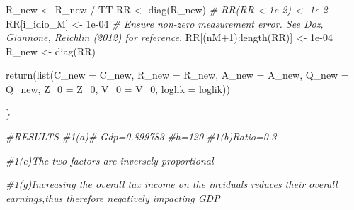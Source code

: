 \documentclass[
]{article}
\newenvironment{Shaded}{\begin{snugshade}}{\end{snugshade}}
\newcommand{\AttributeTok}[1]{\textcolor[rgb]{0.77,0.63,0.00}{#1}}
\newcommand{\CommentTok}[1]{\textcolor[rgb]{0.56,0.35,0.01}{\textit{#1}}}
\newcommand{\DecValTok}[1]{\textcolor[rgb]{0.00,0.00,0.81}{#1}}
\newcommand{\FloatTok}[1]{\textcolor[rgb]{0.00,0.00,0.81}{#1}}
\newcommand{\FunctionTok}[1]{\textcolor[rgb]{0.00,0.00,0.00}{#1}}
\newcommand{\NormalTok}[1]{#1}
\newcommand{\OtherTok}[1]{\textcolor[rgb]{0.56,0.35,0.01}{#1}}
\newcommand{\SpecialCharTok}[1]{\textcolor[rgb]{0.00,0.00,0.00}{#1}}
\begin{document}
\begin{Shaded}
\begin{Highlighting}[]
\NormalTok{  R\_new }\OtherTok{\textless{}{-}}\NormalTok{ R\_new }\SpecialCharTok{/}\NormalTok{ TT}
\NormalTok{  RR }\OtherTok{\textless{}{-}} \FunctionTok{diag}\NormalTok{(R\_new) }\CommentTok{\# RR(RR \textless{} 1e{-}2) \textless{}{-} 1e{-}2}
\NormalTok{  RR[i\_idio\_M] }\OtherTok{\textless{}{-}} \FloatTok{1e{-}04} \CommentTok{\# Ensure non{-}zero measurement error. See Doz, Giannone, Reichlin (2012) for reference.}
\NormalTok{  RR[(nM}\SpecialCharTok{+}\DecValTok{1}\NormalTok{)}\SpecialCharTok{:}\FunctionTok{length}\NormalTok{(RR)] }\OtherTok{\textless{}{-}} \FloatTok{1e{-}04}
\NormalTok{  R\_new }\OtherTok{\textless{}{-}} \FunctionTok{diag}\NormalTok{(RR) }
  
  \FunctionTok{return}\NormalTok{(}\FunctionTok{list}\NormalTok{(}\AttributeTok{C\_new =}\NormalTok{ C\_new, }\AttributeTok{R\_new =}\NormalTok{ R\_new, }\AttributeTok{A\_new =}\NormalTok{ A\_new, }\AttributeTok{Q\_new =}\NormalTok{ Q\_new, }\AttributeTok{Z\_0 =}\NormalTok{ Z\_0, }\AttributeTok{V\_0 =}\NormalTok{ V\_0, }\AttributeTok{loglik =}\NormalTok{ loglik))}
  
\NormalTok{\}}

\CommentTok{\#RESULTS}
\CommentTok{\#1(a)\# Gdp=0.899783}
\CommentTok{\#h=120}
\CommentTok{\#1(b)Ratio=0.3}

\CommentTok{\#1(e)The two factors are inversely proportional}

\CommentTok{\#1(g)Increasing the overall tax income on the inviduals reduces their overall earnings,thus therefore negatively impacting GDP}
\end{Highlighting}
\end{Shaded}
\end{document}
